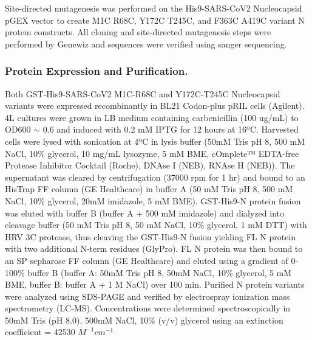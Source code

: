 \documentclass[../main.tex]{subfiles}
\begin{document}
        Site-directed mutagenesis was performed on the His9-SARS-CoV2 Nucleocapsid pGEX vector to create M1C R68C, Y172C T245C, and F363C A419C variant N protein constructs. All cloning and site-directed mutagenesis steps were performed by Genewiz and sequences were verified using sanger sequencing. 

    \subsubsection{Protein Expression and Purification.}
        Both GST-His9-SARS-CoV2 M1C-R68C and Y172C-T245C Nucleocapsid variants were expressed recombinantly in BL21 Codon-plus pRIL cells (Agilent). 4L cultures were grown in LB medium containing carbenicillin (100 ug/mL) to OD600 $\sim$ 0.6 and induced with 0.2 mM IPTG for 12 hours at 16ºC. Harvested cells were lysed with sonication at 4ºC in lysis buffer (50mM Tris pH 8, 500 mM NaCl, 10\% glycerol, 10 mg/mL lysozyme, 5 mM BME, cOmplete™ EDTA-free Protease Inhibitor Cocktail (Roche), DNAse I (NEB), RNAse H (NEB)). The supernatant was cleared by centrifugation (37000 rpm for 1 hr) and bound to an HisTrap FF column (GE Healthcare) in buffer A (50 mM Tris pH 8, 500 mM NaCl, 10\% glycerol, 20mM imidazole, 5 mM BME). GST-His9-N protein fusion was eluted with buffer B (buffer A + 500 mM imidazole) and dialyzed into cleavage buffer (50 mM Tris pH 8, 50 mM NaCl, 10\% glycerol, 1 mM DTT) with HRV 3C protease, thus cleaving the GST-His9-N fusion yielding FL N protein with two additional N-term residues (GlyPro). FL N protein was then bound to an SP sepharose FF column (GE Healthcare) and eluted using a gradient of 0-100\% buffer B (buffer A: 50mM Tris pH 8, 50mM NaCl, 10\% glycerol, 5 mM BME, buffer B: buffer A + 1 M NaCl) over 100 min. Purified N protein variants were analyzed using SDS-PAGE and verified by electrospray ionization mass spectrometry (LC-MS).  Concentrations were determined spectroscopically in 50mM Tris (pH 8.0), 500mM NaCl, 10\% (v/v) glycerol using an extinction coefficient = 42530 $M^{-1}cm^{-1}$
\end{document}

